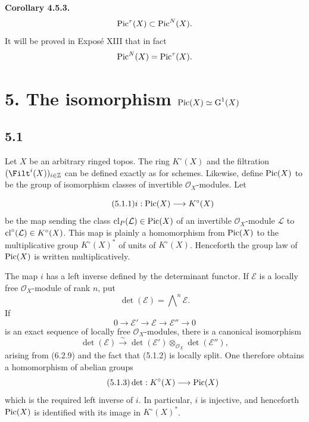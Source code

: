 \textbf{Corollary 4.5.3.}
\[
\operatorname{Pic}^\tau(X)\subset\operatorname{Pic}^N(X).
\]
It will be proved in Expos\'e XIII that in fact
\[
\operatorname{Pic}^N(X)=\operatorname{Pic}^\tau(X).
\]

\section*{5. The isomorphism $\operatorname{Pic}(X)\simeq\operatorname{G}^1(X)$}

\subsection*{5.1}
Let $X$ be an arbitrary ringed topos. The ring $K^\circ(X)$ and the
filtration $(\Filt^i(X))_{i\in\mathbb Z}$ can be defined exactly as for
schemes. Likewise, define $\operatorname{Pic}(X)$ to be the group of isomorphism classes of
invertible $\mathcal O_X$-modules. Let

\begin{equation}\tag{5.1.1}
i:\operatorname{Pic}(X)\longrightarrow K^\circ(X)
\end{equation}
be the map sending the class $\operatorname{cl}_P(\mathcal L)\in\operatorname{Pic}(X)$ of an invertible
$\mathcal O_X$-module $\mathcal L$ to
$\operatorname{cl}^\circ(\mathcal L)\in K^\circ(X)$. This map is plainly a homomorphism
from $\operatorname{Pic}(X)$ to the multiplicative group $K^\circ(X)^*$ of units of
$K^\circ(X)$. Henceforth the group law of $\operatorname{Pic}(X)$ is written
multiplicatively.

The map $i$ has a left inverse defined by the determinant functor. If
$\mathcal E$ is a locally free $\mathcal O_X$-module of rank $n$, put
\[
\det(\mathcal E)=\bigwedge\nolimits^n\mathcal E.
\]
If
\begin{equation}\tag{5.1.2}
0\longrightarrow\mathcal E'\longrightarrow\mathcal E
\longrightarrow\mathcal E''\longrightarrow0
\end{equation}
is an exact sequence of locally free $\mathcal O_X$-modules, there is a
canonical isomorphism
\[
\det(\mathcal E)\xrightarrow{\sim}
\det(\mathcal E')\otimes_{\mathcal O_X}\det(\mathcal E''),
\]
arising from (6.2.9) and the fact that (5.1.2) is locally split. One therefore
obtains a homomorphism of abelian groups
\begin{equation}\tag{5.1.3}
\det:K^\circ(X)\longrightarrow\operatorname{Pic}(X)
\end{equation}
which is the required left inverse of $i$. In particular, $i$ is injective,
and henceforth $\operatorname{Pic}(X)$ is identified with its image in $K^\circ(X)^*$.

